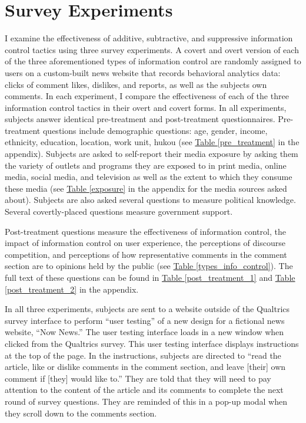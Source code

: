\documentclass[11pt]{article}
\begin{document}
\section{Survey Experiments}

I examine the effectiveness of additive, subtractive, and suppressive information control tactics using three survey experiments. A covert and overt version of each of the three aforementioned types of information control are randomly assigned to users on a custom-built news website that records behavioral analytics data: clicks of comment likes, dislikes, and reports, as well as the subjects own comments. In each experiment, I compare the effectiveness of each of the three information control tactics in their overt and covert forms. In all experiments, subjects answer identical pre-treatment and post-treatment questionnaires. Pre-treatment questions include demographic questions: age, gender, income, ethnicity, education, location, work unit, hukou (see \hyperref[pre_treatment]{Table \ref*{pre_treatment}} in the appendix). Subjects are asked to self-report their media exposure by asking them the variety of outlets and programs they are exposed to in print media, online media, social media, and television as well as the extent to which they consume these media (see \hyperref[exposure]{Table \ref*{exposure}} in the appendix for the media sources asked about). Subjects are also asked several questions to measure political knowledge. Several covertly-placed questions measure government support.

Post-treatment questions measure the effectiveness of information control, the impact of information control on user experience, the perceptions of discourse competition, and perceptions of how representative comments in the comment section are to opinions held by the public (see \hyperref[types_info_control]{Table \ref*{types_info_control}}). The full text of these questions can be found in \hyperref[post_treatment_1]{Table \ref*{post_treatment_1}} and \hyperref[post_treatment_2]{Table \ref*{post_treatment_2}} in the appendix.

In all three experiments, subjects are sent to a website outside of the Qualtrics survey interface to perform ``user testing'' of a new design for a fictional news website, ``Now News.'' The user testing interface loads in a new window when clicked from the Qualtrics survey. This user testing interface displays instructions at the top of the page. In the instructions, subjects are directed to ``read the article, like or dislike comments in the comment section, and leave [their] own comment if [they] would like to.'' They are told that they will need to pay attention to the content of the article and its comments to complete the next round of survey questions. They are reminded of this in a pop-up modal when they scroll down to the comments section.
\end{document}
